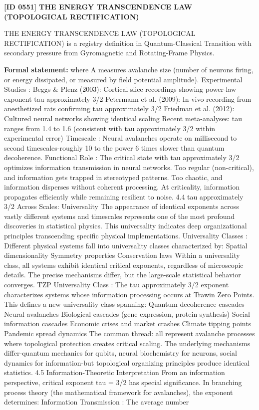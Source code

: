 \clearpage
\noindent\textbf{[ID 0551] THE ENERGY TRANSCENDENCE LAW (TOPOLOGICAL RECTIFICATION)}\par
\vspace{0.35em}
\begingroup\small
{}
THE ENERGY TRANSCENDENCE LAW (TOPOLOGICAL RECTIFICATION) is a registry definition in Quantum-Classical Transition with secondary pressure from Gyromagnetic and Rotating-Frame Physics.

\begingroup\footnotesize\setlength{\emergencystretch}{3em}\sloppy
\textbf{Formal statement:} where A measures avalanche size (number of neurons firing, or energy dissipated, or measured by field potential amplitude). Experimental Studies : Beggs \& Plenz (2003): Cortical slice recordings showing power-law exponent tau approximately 3/2 Petermann et al. (2009): In-vivo recording from anesthetized rats confirming tau approximately 3/2 Friedman et al. (2012): Cultured neural networks showing identical scaling Recent meta-analyses: tau ranges from 1.4 to 1.6 (consistent with tau approximately 3/2 within experimental error) Timescale : Neural avalanches operate on millisecond to second timescales-roughly 10 to the power 6 times slower than quantum decoherence. Functional Role : The critical state with tau approximately 3/2 optimizes information transmission in neural networks. Too regular (non-critical), and information gets trapped in stereotyped patterns. Too chaotic, and information disperses without coherent processing. At criticality, information propagates efficiently while remaining resilient to noise. 4.4 tau approximately 3/2 Across Scales: Universality The appearance of identical exponents across vastly different systems and timescales represents one of the most profound discoveries in statistical physics. This universality indicates deep organizational principles transcending specific physical implementations. Universality Classes : Different physical systems fall into universality classes characterized by: Spatial dimensionality Symmetry properties Conservation laws Within a universality class, all systems exhibit identical critical exponents, regardless of microscopic details. The precise mechanisms differ, but the large-scale statistical behavior converges. TZP Universality Class : The tau approximately 3/2 exponent characterizes systems whose information processing occurs at Trawin Zero Points. This defines a new universality class spanning: Quantum decoherence cascades Neural avalanches Biological cascades (gene expression, protein synthesis) Social information cascades Economic crises and market crashes Climate tipping points Pandemic spread dynamics The common thread: all represent avalanche processes where topological protection creates critical scaling. The underlying mechanisms differ-quantum mechanics for qubits, neural biochemistry for neurons, social dynamics for information-but topological organizing principles produce identical statistics. 4.5 Information-Theoretic Interpretation From an information perspective, critical exponent tau = 3/2 has special significance. In branching process theory (the mathematical framework for avalanches), the exponent determines: Information Transmission : The average number 